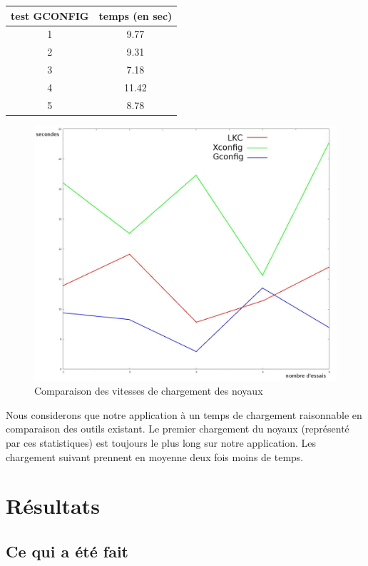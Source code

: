 \documentclass[16pts]{report}
\begin{document}
\begin{tabular}{|c|c|}
\hline
test GCONFIG & temps (en sec) \\
\hline
\hline
1 & 9.77 \\
\hline 
2 & 9.31 \\
\hline
3 & 7.18 \\
\hline
4 & 11.42 \\
\hline
5 & 8.78 \\
\hline
\end{tabular}

\begin{figure}[H]
	\includegraphics[scale=0.5]{./illustrations/speed_cmp.jpeg}
	\centering
	\caption{Comparaison des vitesses de chargement des noyaux}
	\label{fig:VitesseChargement}
\end{figure}

Nous considerons que notre application à un temps de chargement raisonnable
en comparaison des outils existant. Le premier chargement du noyaux (représenté
par ces statistiques) est toujours le plus long sur notre application. Les
chargement suivant prennent en moyenne deux fois moins de temps.

\chapter{Résultats}
\label{cha:Résultats}
    \section{Ce qui a été fait}
    \label{sec:Ce qui a été fait}
\end{document}
